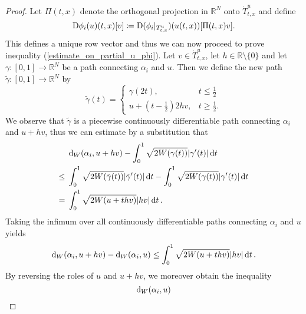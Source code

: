 \begin{proof}
	Let $ \Pi ( t , x ) $ denote the orthogonal projection in $ \mathbb{ R }^{ 
	N } $ onto $ \dot{ T }_{ t , x }^{ u } $ and define 
	\begin{equation*}
		\mathrm{D} \phi_{ i } ( u ) ( t, x ) [ v ]
		\coloneqq
		\mathrm{D} ( \phi_{ i } |_{ T_{ t , x }^{ u } } ) ( u ( t , x ) ) [ \Pi ( t , x ) v ].
	\end{equation*}
	This defines a unique row vector and thus we can now proceed to prove inequality (\ref{estimate_on_partial_u_phi}).
	Let $ v \in \dot{ T }_{ t, x }^{ u } $, let $ h \in \mathbb{ R } \setminus 
	\{ 0 \} $ and let $ \gamma \colon [ 0 , 1 ] \to \mathbb{ R }^{ N } $ be a 
	path connecting $ \alpha_{ i } $ and $ u $. Then we define the new path $ 
	\tilde{ \gamma } \colon [ 0 , 1 ] \to \mathbb{ R }^{ N } $ by 
	\begin{equation*}
		\tilde{ \gamma } ( t ) =
		\begin{cases}
			\gamma ( 2 t ),
			&  t \leq \frac{ 1 }{ 2 }
			\\
			u + 
			\left( t - \frac{ 1 }{ 2 } \right)
			2 h v,
			& t \geq \frac{ 1 }{ 2 }.
		\end{cases}
	\end{equation*}
	We observe that $ \tilde{ \gamma } $ is a piecewise continuously differentiable path connecting $ \alpha_{i } $ and $ u + h v $, thus we can estimate by a substitution that
	\begin{align*}
		& \geodesic_distance ( \alpha_{ i } , u + hv )
		-
		\int_{ 0 }^{ 1 }
			\sqrt{
				2 W ( \gamma ( t ) ) }
			\abs{ \gamma ' ( t ) }
		\dd{ t }
		\\
		\leq {} &
		\int_{ 0 }^{ 1 }
			\sqrt{ 2 W ( \tilde{ \gamma } ( t ) ) } 
			\abs{ \tilde{ \gamma } ' ( t ) }
		\dd{ t }
		-
		\int_{ 0 }^{ 1 }
			\sqrt{ 2 W ( \gamma ( t ) ) } 
			\abs{ \gamma ' ( t ) }
		\dd{ t }
		\\
		={} &
		\int_{ 0 }^{ 1 }
			\sqrt{ 2 W ( u + t h v ) }
			\abs{ h v }
		\dd{ t }.
	\end{align*}
	Taking the infimum over all continuously differentiable paths connecting $ 
	\alpha_{ i } $ and $ u $ yields 
	\begin{equation*}
		\geodesic_distance ( \alpha_{ i } , u + h v )
		- 
		\geodesic_distance ( \alpha_{ i } , u )
		\leq
		\int_{ 0 }^{ 1 }
			\sqrt{ 2 W ( u + t h v ) }
			\abs{ h v }
		\dd{ t }.
	\end{equation*}
	By reversing the roles of $ u $ and $ u + h v $, we moreover obtain the 
	inequality
	\begin{equation*}
		\geodesic_distance ( \alpha_{ i } , u ) 

\end{equation*}
\end{proof}

